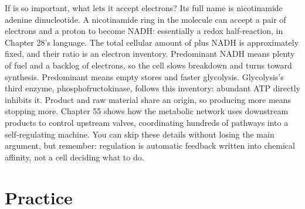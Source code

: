 \begin{tiaozhan}
If  is so important, what lets it accept electrons? Its full name is nicotinamide adenine dinucleotide. A nicotinamide ring in the molecule can accept a pair of electrons and a proton to become NADH: essentially a redox half-reaction, in Chapter 28's language. The total cellular amount of  plus NADH is approximately fixed, and their ratio is an electron inventory. Predominant NADH means plenty of fuel and a backlog of electrons, so the cell slows breakdown and turns toward synthesis. Predominant  means empty stores and faster glycolysis. Glycolysis's third enzyme, phosphofructokinase, follows this inventory: abundant ATP directly inhibits it. Product and raw material share an origin, so producing more means stopping more. Chapter 55 shows how the metabolic network uses downstream products to control upstream valves, coordinating hundreds of pathways into a self-regulating machine. You can skip these details without losing the main argument, but remember: regulation is automatic feedback written into chemical affinity, not a cell deciding what to do.
\end{tiaozhan}

\section*{Practice}

